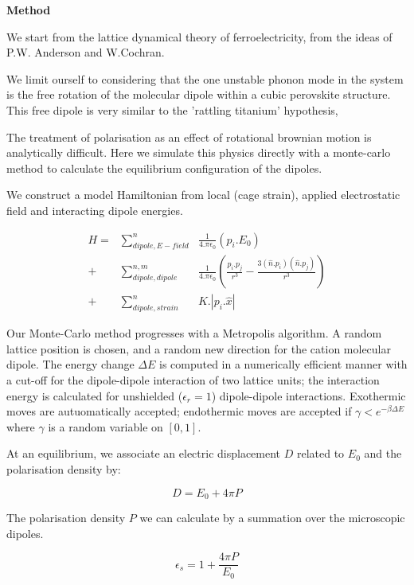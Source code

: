 \documentclass[journal=jacsat,manuscript=communication]{achemso}
\begin{document}
\textbf{Method}

We start from the lattice dynamical theory of ferroelectricity, from the ideas of P.W. Anderson\cite{anderson_career_1994} and W.Cochran\cite{cochran_crystal_1960,cochran_crystal_1961}. 

We limit ourself to considering that the one unstable phonon mode in the system is the free rotation of the molecular dipole within a cubic perovskite structure. 
This free dipole is very similar to the 'rattling titanium' hypothesis, 

The treatment of polarisation as an effect of rotational brownian motion is analytically difficult\cite{mcconnell_rotational_1980}.
Here we simulate this physics directly with a monte-carlo method to calculate the equilibrium configuration of the dipoles.

We construct a model Hamiltonian from local (cage strain), applied electrostatic field and interacting dipole energies.

\begin{align}
H = &\sum^n_{dipole,E-field} &\frac{1}{4.\pi \epsilon_0} (p_i.E_0) \\
+ &\sum^{n,m}_{dipole,dipole} &\frac{1}{4.\pi \epsilon_0} (\frac{p_i.p_j}{r^3}-\frac{3(\hat{n}.p_i)(\hat{n}.p_j)}{r^3}) \\
+ &\sum^n_{dipole,strain} &K.|p_i.\hat{x}|
\end{align}  

Our Monte-Carlo method progresses with a Metropolis algorithm. 
A random lattice position is chosen, and a random new direction for the cation molecular dipole. 
The energy change $\Delta E$ is computed in a numerically efficient manner with a cut-off for the dipole-dipole interaction of two lattice units; the interaction energy is calculated for unshielded ($\epsilon_r =1$) dipole-dipole interactions. 
Exothermic moves are autuomatically accepted; endothermic moves are accepted if $\gamma < e^{-\beta \Delta E}$ where $\gamma$ is a random variable on $[0,1]$.

At an equilibrium, we associate an electric displacement $D$ related to $E_0$ and the polarisation density by:

\begin{equation}
D =  E_0 + 4\pi P
\end{equation}

The polarisation density $P$ we can calculate by a summation over the microscopic dipoles. 

\begin{equation}
\epsilon_s = 1+ \frac{4\pi P}{E_0}
\end{equation}
\end{document}
